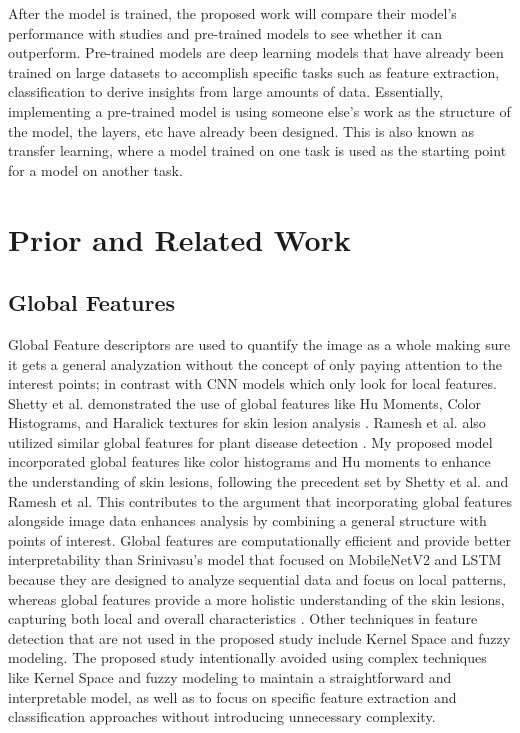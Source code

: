 \documentclass[10pt,twocolumn]{article}
\begin{document}
\newline
\newline
After the model is trained, the proposed work will compare their model’s performance with studies and pre-trained models to see whether it can outperform. Pre-trained models are deep learning models that have already been trained on large datasets to accomplish specific tasks such as feature extraction, classification to derive insights from large amounts of data. Essentially, implementing a pre-trained model is using someone else’s work as the structure of the model, the layers, etc have already been designed. This is also known as transfer learning, where a model trained on one task is used as the starting point for a model on another task. 

\section{Prior and Related Work}

\subsection{Global Features}
Global Feature descriptors are used to quantify the image as a whole making sure it gets a general analyzation without the concept of only paying attention to the interest points; in contrast with CNN models which only look for local features.
\newline
\newline
Shetty et al. demonstrated the use of global features like Hu Moments, Color Histograms, and Haralick textures for skin lesion analysis \cite{shetty2022skin}. Ramesh et al. also utilized similar global features for plant disease detection \cite{ramesh2018plant}. My proposed model incorporated global features like color histograms and Hu moments to enhance the understanding of skin lesions, following the precedent set by Shetty et al. and Ramesh et al. This contributes to the argument that incorporating global features alongside image data enhances analysis by combining a general structure with points of interest.
\newline
\newline
Global features are computationally efficient and provide better interpretability than Srinivasu’s model that focused on MobileNetV2 and LSTM because they are designed to analyze sequential data and focus on local patterns, whereas global features provide a more holistic understanding of the skin lesions, capturing both local and overall characteristics \cite{srinivasu2021classification}.
\newline\newline
Other techniques in feature detection that are not used in the proposed study include Kernel Space and fuzzy modeling. The proposed study intentionally avoided using complex techniques like Kernel Space and fuzzy modeling to maintain a straightforward and interpretable model, as well as to focus on specific feature extraction and classification approaches without introducing unnecessary complexity.
\end{document}
